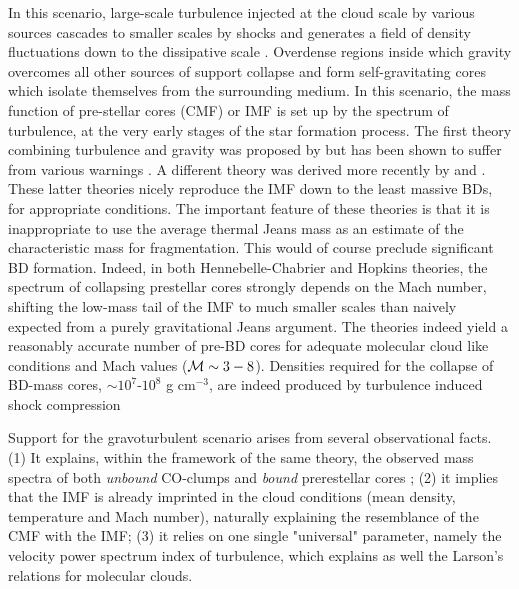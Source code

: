 In this scenario, large-scale turbulence injected at the cloud scale by various sources 
cascades to smaller scales by shocks and generates a field of density fluctuations down to the dissipative scale \citep[e.g.][]{MacLow2004}. Overdense regions inside which gravity overcomes all other sources of support collapse and form self-gravitating cores which isolate themselves from the surrounding medium. In this scenario, the mass function of pre-stellar cores (CMF) or IMF is set up by the spectrum of turbulence, at the very early stages of the star formation process. 
The first theory combining turbulence and gravity was proposed by \cite{Padoan2002} but has been shown to suffer from various warnings 
\citep[e.g.][]{McKee2007, Hennebelle2011a}. 
A different theory was derived more recently by \cite{Hennebelle2008a,Hennebelle2009a, Hennebelle2013} and \cite{Hopkins2012}. These latter theories nicely reproduce the IMF down to the least massive BDs, for appropriate conditions. The important feature
of these theories is that it is inappropriate to use the average thermal Jeans mass as an estimate of the characteristic mass for fragmentation. This would of course preclude significant BD formation. Indeed, in both Hennebelle-Chabrier and Hopkins theories, the spectrum of collapsing prestellar cores strongly depends on the Mach number, shifting the low-mass tail of the IMF to much smaller scales than naively expected from a purely gravitational Jeans argument. The theories indeed yield a reasonably accurate number of pre-BD cores for adequate molecular cloud like conditions and Mach values (${\cal M}\sim 3-8$). Densities required for the 
collapse of BD-mass cores, $\sim 10^7$-$10^8$ g cm$^{-3}$, are indeed produced by turbulence induced shock compression 

Support for the gravoturbulent scenario arises from several observational facts. (1) It explains, within the framework of the same theory, the observed mass spectra of both {\it unbound} CO-clumps and {\it bound} prerestellar cores \citep{Hennebelle2008b}; (2) it implies that the IMF is already imprinted in the cloud conditions (mean density, temperature and Mach number), naturally explaining the resemblance of the CMF with the IMF; (3) it relies on one single "universal" parameter, namely the velocity power spectrum index of turbulence, which explains as well the Larson's relations for molecular clouds.

